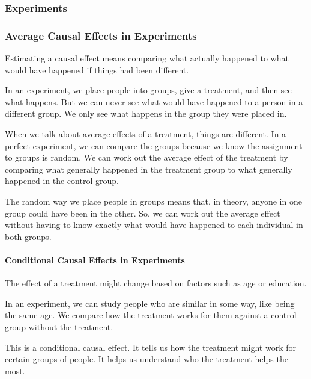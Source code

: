 \documentclass[
  singlecolumn]{article}
\let\oldparagraph\paragraph
\renewcommand{\paragraph}[1]{\oldparagraph{#1}\mbox{}}
\begin{document}
\subsubsection{Experiments}\label{experiments}

\subsubsection{\texorpdfstring{\textbf{Average Causal Effects in
Experiments}}{Average Causal Effects in Experiments}}\label{average-causal-effects-in-experiments}

Estimating a causal effect means comparing what actually happened to
what would have happened if things had been different.

In an experiment, we place people into groups, give a treatment, and
then see what happens. But we can never see what would have happened to
a person in a different group. We only see what happens in the group
they were placed in.

When we talk about average effects of a treatment, things are different.
In a perfect experiment, we can compare the groups because we know the
assignment to groups is random. We can work out the average effect of
the treatment by comparing what generally happened in the treatment
group to what generally happened in the control group.

The random way we place people in groups means that, in theory, anyone
in one group could have been in the other. So, we can work out the
average effect without having to know exactly what would have happened
to each individual in both groups.

\paragraph{\texorpdfstring{\textbf{Conditional Causal Effects in
Experiments}}{Conditional Causal Effects in Experiments}}\label{conditional-causal-effects-in-experiments}

The effect of a treatment might change based on factors such as age or
education.

In an experiment, we can study people who are similar in some way, like
being the same age. We compare how the treatment works for them against
a control group without the treatment.

This is a conditional causal effect. It tells us how the treatment might
work for certain groups of people. It helps us understand who the
treatment helps the most.
\end{document}
